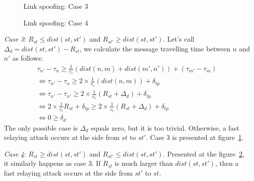 \begin{figure}
	\caption{Link spoofing: Case 3} \label{chap3case3}
	\centering
\end{figure}
		
\begin{figure}
    \caption{Link spoofing: Case 4} \label{chap3case4} 
    \centering

\end{figure}

\emph{Case 3}: $R_{st} \le dist(st,st')$ and $R_{st'} \ge dist(st,st')$. Let's call $\Delta_d = dist(st,st') - R_{st}$, we calculate the message travelling time between $n$ and $n'$ as follows: 
\begin{equation*}
\begin{split}
		\tau_{n'} - \tau_{n} \ge \frac 1 {v_c}(dist(n,m) + dist(m', n')) + (\tau_{m'} - \tau_{m}) \\ \Leftrightarrow
		\tau_{n'} - \tau_{n} \ge 2 \times \frac 1 {v_c}(dist(n,m)) + \delta_{tp}\\ \Leftrightarrow
		\tau_{n'} - \tau_{n'} \ge 2 \times \frac 1 {v_c} (R_{st} + \Delta_d) + \delta_{tp} \\ \Leftrightarrow
		2 \times \frac 1 {v_c} R_{st} + \delta_{tp} \ge 2 \times \frac 1 {v_c} (R_{st} + \Delta_d ) + \delta_{tp} \\ \Leftrightarrow
		0 \ge \delta_{d} 
\end{split}
\end{equation*}
The only possible case is $\Delta_{d}$ equals zero, but it is too trivial. Otherwise, a fast relaying attack occurs at the side from $st$ to $st'$. Case 3 is presented at figure~\ref{chap3case3}.

\emph{Case 4}: $R_{st} \ge dist(st,st')$ and $R_{st'} \le dist(st,st')$. Presented at the figure~\ref{chap3case4}, it similarly happens as case 3. If $R_{st}$ is much larger than $dist(st,st')$, then a fast relaying attack occurs at the side from $st'$ to $st$. 
